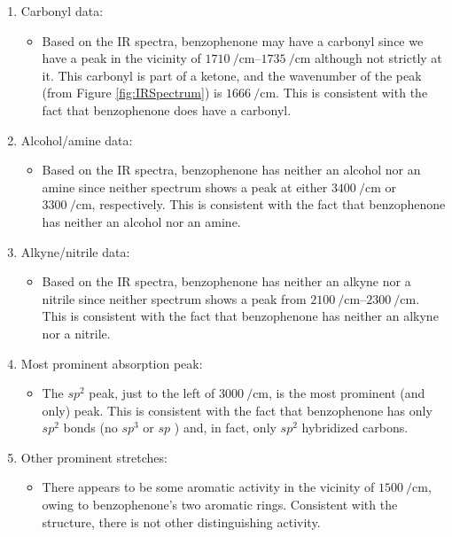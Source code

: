 \documentclass[titlepage]{article}
\begin{document}
\begin{enumerate}
\begin{itemize}
    \end{itemize}
    \item Carbonyl data:
    \begin{itemize}
        \item Based on the IR spectra, benzophenone may have a carbonyl since we have a peak in the vicinity of $\SIrange{1710}{1735}{\per\centi\meter}$ although not strictly at it. This carbonyl is part of a ketone, and the wavenumber of the peak (from Figure \ref{fig:IRSpectrum}) is $\SI{1666}{\per\centi\meter}$. This is consistent with the fact that benzophenone does have a carbonyl.
    \end{itemize}
    \item Alcohol/amine data:
    \begin{itemize}
        \item Based on the IR spectra, benzophenone has neither an alcohol nor an amine since neither spectrum shows a peak at either $\SI{3400}{\per\centi\meter}$ or $\SI{3300}{\per\centi\meter}$, respectively. This is consistent with the fact that benzophenone has neither an alcohol nor an amine.
    \end{itemize}
    \item Alkyne/nitrile data:
    \begin{itemize}
        \item Based on the IR spectra, benzophenone has neither an alkyne nor a nitrile since neither spectrum shows a peak from $\SIrange{2100}{2300}{\per\centi\meter}$. This is consistent with the fact that benzophenone has neither an alkyne nor a nitrile.
    \end{itemize}
    \item Most prominent  absorption peak:
    \begin{itemize}
        \item The $sp^2$  peak, just to the left of $\SI{3000}{\per\centi\meter}$, is the most prominent (and only)  peak. This is consistent with the fact that benzophenone has only $sp^2$  bonds (no $sp^3$ or $sp$ ) and, in fact, only $sp^2$ hybridized carbons.
    \end{itemize}
    \item Other prominent stretches:
    \begin{itemize}
        \item There appears to be some aromatic activity in the vicinity of $\SI{1500}{\per\centi\meter}$, owing to benzophenone's two aromatic rings. Consistent with the structure, there is not other distinguishing activity.
    \end{itemize}
\end{enumerate}
\newpage



\printbibliography
\end{document}
